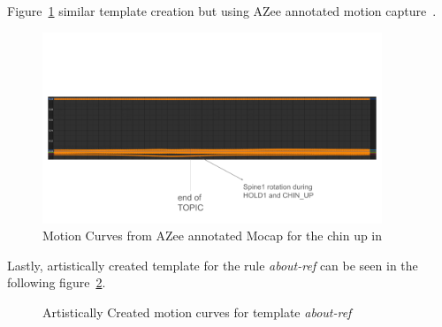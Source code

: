 \documentclass[../../main.tex]{subfiles}
\begin{document}
Figure~\ref{fig:motion_curves_mocap} similar template creation but using AZee annotated motion capture~\cite{bertin2022rosetta}.

\begin{figure}
    \centering \includegraphics[width = 4in]{chapters/intermediate_blocks/images/motion_curves_mocap.png}
    \caption{Motion Curves from AZee annotated Mocap for the chin up in }
    \label{fig:motion_curves_mocap}
\end{figure}

Lastly, artistically created template for the rule \emph{about-ref} can be seen in the following figure~\ref{fig:motion_curves_template_artist}.

\begin{figure}
     \centering
    \caption{Artistically Created motion curves for template \emph{about-ref}}
    \label{fig:motion_curves_template_artist}
\end{figure}
\end{document}
